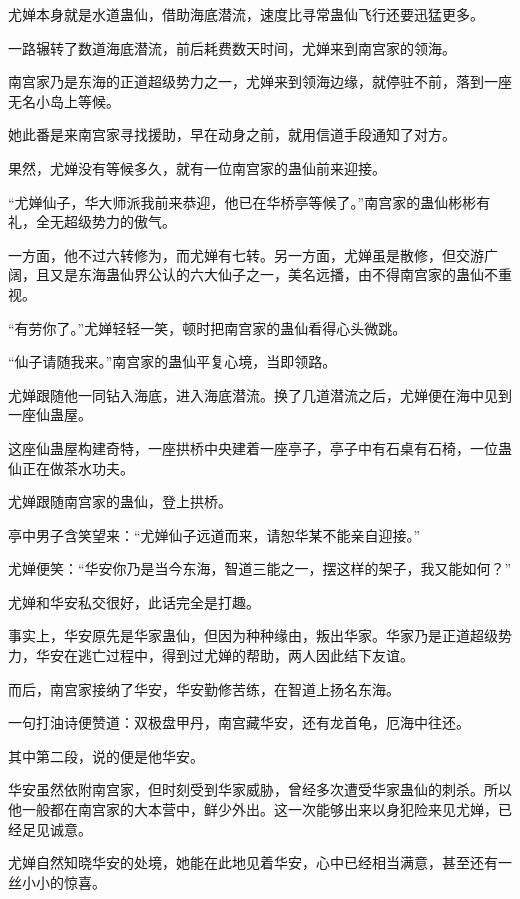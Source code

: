 
\begin{this_body}

尤婵本身就是水道蛊仙，借助海底潜流，速度比寻常蛊仙飞行还要迅猛更多。

一路辗转了数道海底潜流，前后耗费数天时间，尤婵来到南宫家的领海。

南宫家乃是东海的正道超级势力之一，尤婵来到领海边缘，就停驻不前，落到一座无名小岛上等候。

她此番是来南宫家寻找援助，早在动身之前，就用信道手段通知了对方。

果然，尤婵没有等候多久，就有一位南宫家的蛊仙前来迎接。

“尤婵仙子，华大师派我前来恭迎，他已在华桥亭等候了。”南宫家的蛊仙彬彬有礼，全无超级势力的傲气。

一方面，他不过六转修为，而尤婵有七转。另一方面，尤婵虽是散修，但交游广阔，且又是东海蛊仙界公认的六大仙子之一，美名远播，由不得南宫家的蛊仙不重视。

“有劳你了。”尤婵轻轻一笑，顿时把南宫家的蛊仙看得心头微跳。

“仙子请随我来。”南宫家的蛊仙平复心境，当即领路。

尤婵跟随他一同钻入海底，进入海底潜流。换了几道潜流之后，尤婵便在海中见到一座仙蛊屋。

这座仙蛊屋构建奇特，一座拱桥中央建着一座亭子，亭子中有石桌有石椅，一位蛊仙正在做茶水功夫。

尤婵跟随南宫家的蛊仙，登上拱桥。

亭中男子含笑望来：“尤婵仙子远道而来，请恕华某不能亲自迎接。”

尤婵便笑：“华安你乃是当今东海，智道三能之一，摆这样的架子，我又能如何？”

尤婵和华安私交很好，此话完全是打趣。

事实上，华安原先是华家蛊仙，但因为种种缘由，叛出华家。华家乃是正道超级势力，华安在逃亡过程中，得到过尤婵的帮助，两人因此结下友谊。

而后，南宫家接纳了华安，华安勤修苦练，在智道上扬名东海。

一句打油诗便赞道：双极盘甲丹，南宫藏华安，还有龙首龟，厄海中往还。

其中第二段，说的便是他华安。

华安虽然依附南宫家，但时刻受到华家威胁，曾经多次遭受华家蛊仙的刺杀。所以他一般都在南宫家的大本营中，鲜少外出。这一次能够出来以身犯险来见尤婵，已经足见诚意。

尤婵自然知晓华安的处境，她能在此地见着华安，心中已经相当满意，甚至还有一丝小小的惊喜。


\end{this_body}
